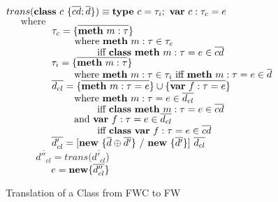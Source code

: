 \begin{figure}

$trans(\textbf{class} ~ c ~ \{\overline{cd}; \overline{d}\}) \equiv \textbf{type}~ c = \tau_i; ~ \textbf{var}~ c:\tau_c = e$ \\
$~~~~~~~ \textrm{where}$ \\
$~~~~~~~~~~~~~~ \tau_c = \{\overline{\textbf{meth}~ m:\tau}\}$ \\
$~~~~~~~~~~~~~~~~~~~~~ \textrm{where}~ \textbf{meth}~ m:\tau \in \tau_c$ \\
$~~~~~~~~~~~~~~~~~~~~~~~~~~~~ \textrm{iff}~ \textbf{class}~ \textbf{meth}~ m:\tau = e \in \overline{cd}$ \\
$~~~~~~~~~~~~~~ \tau_i = \{\overline{\textbf{meth}~ m:\tau}\}$ \\
$~~~~~~~~~~~~~~~~~~~~~\textrm{where}~ \textbf{meth}~ m:\tau \in \tau_i ~\textrm{iff}~ \textbf{meth}~ m:\tau = e \in \overline{d}$ \\
$~~~~~~~~~~~~~~ \overline{d_{cl}} = \{\overline{\textbf{meth}~ m:\tau = e}\} \cup \{\overline{\textbf{var}~ f:\tau = e}\}$ \\
$~~~~~~~~~~~~~~~~~~~~~ \textrm{where}~ \textbf{meth}~ m:\tau = e \in \overline{d_{cl}}$\\
$~~~~~~~~~~~~~~~~~~~~~~~~~~~~ \textrm{iff}~ \textbf{class}~ \textbf{meth}~ m:\tau = e \in \overline{cd}$ \\
$~~~~~~~~~~~~~~~~~~~~~ \textrm{and}~ \textbf{var}~ f:\tau = e \in \overline{d_{cl}}$\\
$~~~~~~~~~~~~~~~~~~~~~~~~~~~~ \textrm{iff}~ \textbf{class}~ \textbf{var}~ f:\tau = e \in \overline{cd}$ \\
$~~~~~~~~~~~~~~ \overline{d'_{cl}} = [\textbf{new} ~ \{\overline{d} \oplus \overline{d'}\} ~ / ~ \textbf{new} ~ \{\overline{d'}\}] ~ \overline{d_{cl}}$ \\
$~~~~~~~~~~~~~~ \overline{d''_{cl}} = trans(\overline{d'_{cl}}$) \\
$~~~~~~~~~~~~~~ e = \textbf{new} \{ \overline{d''_{cl}} \}$ \\

\caption{Translation of a Class from FWC to FW}
\label{f-core3-translate-function}

\end{figure}